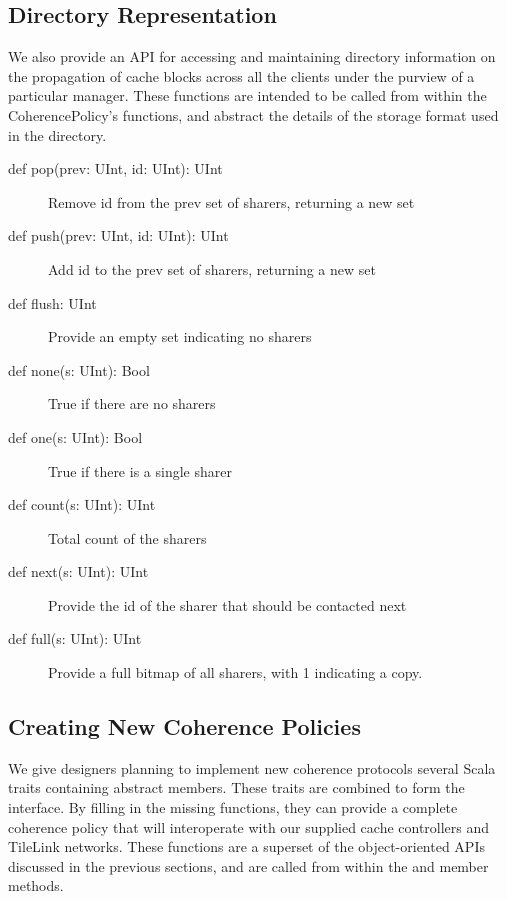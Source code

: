 \subsection{Directory Representation}

We also provide an API for accessing and maintaining directory information on the propagation of cache blocks across all the clients under the purview of a particular manager. These functions are intended to be called from within the CoherencePolicy’s functions, and abstract the details of the storage format used in the directory.

\begin{description}
\item[def pop(prev: UInt, id: UInt): UInt]
Remove id from the prev set of sharers, returning a new set
\item[def push(prev: UInt, id: UInt): UInt]
Add id to the prev set of sharers, returning a new set
\item[def flush: UInt]
Provide an empty set indicating no sharers
\item[def none(s: UInt): Bool]
True if there are no sharers
\item[def one(s: UInt): Bool]
True if there is a single sharer
\item[def count(s: UInt): UInt]
Total count of the sharers
\item[def next(s: UInt): UInt]
Provide the id of the sharer that should be contacted next
\item[def full(s: UInt): UInt]
Provide a full bitmap of all sharers, with 1 indicating a copy.
\end{description}

\subsection{Creating New Coherence Policies}

We give designers planning to implement new coherence protocols several Scala traits
containing abstract members.
These traits are combined to form the  interface.
By filling in the missing functions, they can provide a complete coherence policy
that will interoperate with our supplied cache controllers and TileLink networks.
These functions are a superset of the object-oriented APIs discussed in the previous sections,
and are called from within the  and  member methods.


